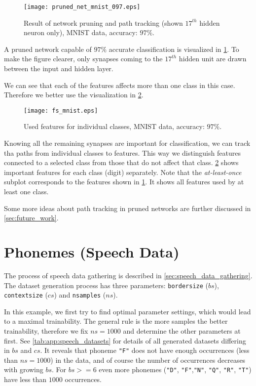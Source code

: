 \begin{figure}[H]
\centering
\texttt{[image: pruned\_net\_mnist\_097.eps]}
\caption{Result of network pruning and path tracking (shown $ 17^{th} $ hidden neuron only), MNIST data, accuracy: $ 97\% $.}
\label{fig:examples:pruned_net_mnist_097}
\end{figure}

A pruned network capable of $ 97\% $ accurate classification is visualized in \cref{fig:examples:pruned_net_mnist_097}. To make the figure clearer, only synapses coming to the $ 17^{th} $ hidden unit are drawn between the input and hidden layer.

We can see that each of the features affects more than one class in this case. Therefore we better use the visualization in \cref{fig:examples:fs_mnist}. 

\begin{figure}[H]
\centering
\texttt{[image: fs\_mnist.eps]}
\caption{Used features for individual classes, MNIST data, accuracy: $ 97\% $.}
\label{fig:examples:fs_mnist}
\end{figure}

Knowing all the remaining synapses are important for classification, we can track tha paths from individual classes to features. This way we distinguish features connected to a selected class from those that do not affect that class. \cref{fig:examples:fs_mnist} shows important features for each class (digit) separately. Note that the \textit{at-least-once} subplot corresponds to the features shown in \cref{fig:examples:pruned_net_mnist_097}. It shows all features used by at least one class.

Some more ideas about path tracking in pruned networks are further discussed in \cref{sec:future_work}.

\section{Phonemes (Speech Data)} \label{sec:example_speech}
The process of speech data gathering is described in \cref{sec:speech_data_gathering}. The dataset generation process has three parameters: \texttt{border\textunderscore size} ($ bs $), \texttt{context\textunderscore size} ($ cs $) and \texttt{n\textunderscore samples} ($ ns $).

In this example, we first try to find optimal parameter settings, which would lead to a maximal trainability. The general rule is the more samples the better trainability, therefore we fix $ ns = 1000 $ and determine the other parameters at first. See \cref{tab:app:speech_datasets} for details of all generated datasets differing in $ bs $ and $ cs $. It reveals that phoneme \texttt{"F"} does not have enough occurrences (less than $ ns = 1000 $) in the data, and of course the number of occurrences decreases with growing $ bs $. For $ bs >= 6 $ even more phonemes (\texttt{"D"}, \texttt{"F"},\texttt{"N"}, \texttt{"Q"}, \texttt{"R"}, \texttt{"T"}) have less than $ 1000 $ occurrences.

